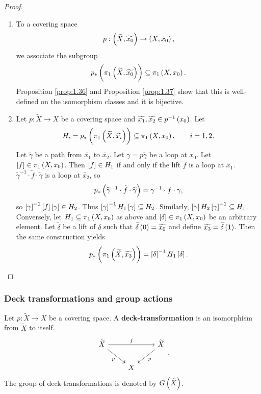 \begin{proof}
\hfill
\begin{enumerate}
\item To a covering space
$$ p : \br{\widetilde{X}, \widetilde{x_0}} \to \br{X, x_0}, $$
we associate the subgroup
$$ p_*\br{\pi_1\br{\widetilde{X}, \widetilde{x_0}}} \subseteq \pi_1\br{X, x_0}. $$
Proposition \ref{prop:1.36} and Proposition \ref{prop:1.37} show that this is well-defined on the isomorphism classes and it is bijective.
\item Let $ p : \widetilde{X} \to X $ be a covering space and $ \widetilde{x_1}, \widetilde{x_2} \in p^{-1}\br{x_0} $. Let
$$ H_i = p_*\br{\pi_1\br{\widetilde{X}, \widetilde{x_i}}} \subseteq \pi_1\br{X, x_0}, \qquad i = 1, 2. $$
Let $ \widetilde{\gamma} $ be a path from $ \widetilde{x_1} $ to $ \widetilde{x_2} $. Let $ \gamma = p\widetilde{\gamma} $ be a loop at $ x_0 $. Let $ \sbr{f} \in \pi_1\br{X, x_0} $. Then $ \sbr{f} \in H_1 $ if and only if the lift $ \widetilde{f} $ is a loop at $ \widetilde{x_1} $. $ \widetilde{\gamma}^{-1} \cdot \widetilde{f} \cdot \widetilde{\gamma} $ is a loop at $ \widetilde{x_2} $, so
$$ p_*\br{\widetilde{\gamma}^{-1} \cdot \widetilde{f} \cdot \widetilde{\gamma}} = \gamma^{-1} \cdot f \cdot \gamma, $$
so $ \sbr{\gamma}^{-1}\sbr{f}\sbr{\gamma} \in H_2 $. Thus $ \sbr{\gamma}^{-1}H_1\sbr{\gamma} \subseteq H_2 $. Similarly, $ \sbr{\gamma}H_2\sbr{\gamma}^{-1} \subseteq H_1 $. Conversely, let $ H_1 \subseteq \pi_1\br{X, x_0} $ as above and $ \sbr{\delta} \in \pi_1\br{X, x_0} $ be an arbitrary element. Let $ \widetilde{\delta} $ be a lift of $ \delta $ such that $ \widetilde{\delta}\br{0} = \widetilde{x_0} $ and define $ \widetilde{x_3} = \widetilde{\delta}\br{1} $. Then the same construction yields
$$ p_*\br{\pi_1\br{\widetilde{X}, \widetilde{x_3}}} = \sbr{\delta}^{-1}H_1\sbr{\delta}. $$
\end{enumerate}
\end{proof}

\pagebreak

\subsubsection{Deck transformations and group actions}

\begin{definition*}
Let $ p : \widetilde{X} \to X $ be a covering space. A \textbf{deck-transformation} is an isomorphism from $ \widetilde{X} $ to itself.
$$
\begin{tikzcd}
\widetilde{X} \arrow{rr}{f} \arrow[swap]{dr}{p} & & \widetilde{X} \arrow{dl}{p} \\
& X &
\end{tikzcd}.
$$
The group of deck-transformations is denoted by $ G\br{\widetilde{X}} $.
\end{definition*}

